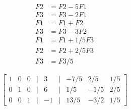 \documentclass[openany]{book}
\begin{document}
\[
\begin{array}{cl}
    F2 &= F2 - 5 F1 \\
    F3 &= F3 - 2 F1 \\
    F1 &= F1 + F2 \\
    F3 &= F3 - 3 F2 \\
    F1 &= F1 + 1/5 F3 \\
    F2 &= F2 + 2/5 F3  \\
    F3 &= F3 / 5
\end{array}
\]

\[
\begin{bmatrix}
    1 & 0 & 0 &|& 3 &|& -7/5 & 2/5 & 1/5\\
    0 & 1 & 0 &|& 6 &|& 1/5 & -1/5 & 2/5\\
    0 & 0 & 1 &|& -1 &|& 13/5 & -3/2 & 1/5
\end{bmatrix}
\]
\end{document}
